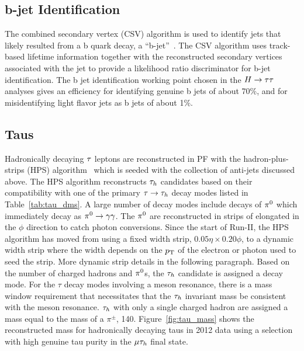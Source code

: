 \subsection{b-jet Identification}
\label{sec:reco_b_jet}
The combined secondary vertex (CSV) algorithm is used to identify jets that likely resulted
from a b quark decay, a ``b-jet''~\cite{CMS:2016kkf, Chatrchyan:2012jua}. 
The CSV algorithm uses track-based lifetime information together with 
the reconstructed secondary vertices associated with the jet to provide a likelihood ratio 
discriminator for b-jet identification. The b jet identification working point chosen in the $H\to\tau\tau$ analyses 
gives an efficiency for identifying genuine b jets of about 70\%, and for misidentifying light flavor jets
as b jets of about 1\%.


\subsection{Taus}
\label{sec:obj_reco_tau}
Hadronically decaying $\tau$ leptons are reconstructed in PF with the hadron-plus-strips (HPS)
algorithm~\cite{Khachatryan:2015dfa, CMS-PAS-TAU-16-002} which is seeded with the collection of 
anti-\kt jets discussed above. The HPS algorithm reconstructs $\tau_{h}$ candidates based on their
compatibility with one of the primary $\tau\to\tau_{h}$ decay modes listed in Table~\ref{tab:tau_dms}.
A large number of decay modes include decays of $\pi^{0}$ which immediately decay as 
$\pi^{0}  \to  \gamma\gamma$. The $\pi^{0}$ are
reconstructed in strips of \etaphi elongated in the $\phi$ direction to catch photon conversions.
Since the start of Run-II, the HPS algorithm has moved from using a fixed width strip,
$0.05 \eta \times 0.20 \phi$, to a dynamic width strip where the width depends on the 
$p_\mathrm{T}$ of the electron or photon used to seed the strip. More dynamic strip details in the following paragraph.
Based on the number of
charged hadrons and $\pi^{0}$s, the $\tau_{h}$ candidate is assigned a decay mode. For the $\tau$
decay modes involving a meson resonance, there is a mass window requirement that necessitates
that the $\tau_{h}$ invariant mass be consistent with the meson resonance. $\tau_{h}$ with only a single
charged hadron are assigned a mass equal to the mass of a $\pi^{\pm}$, 140\MeV. Figure~\ref{fig:tau_mass}
shows the reconstructed mass for hadronically decaying taus in 2012 data using a selection with
high genuine tau purity in the $\mu\tau_{h}$ final state.

